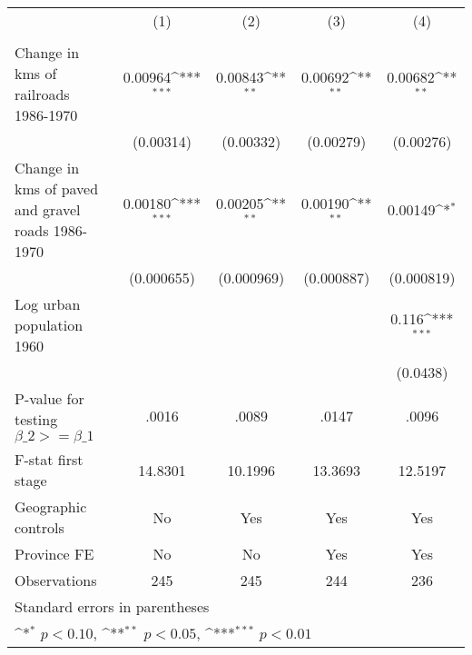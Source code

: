{
\def\sym#1{\ifmmode^{#1}\else\(^{#1}\)\fi}
\begin{tabular}{l*{4}{c}}
\hline\hline
                &\multicolumn{1}{c}{(1)}&\multicolumn{1}{c}{(2)}&\multicolumn{1}{c}{(3)}&\multicolumn{1}{c}{(4)}\\
                &\multicolumn{1}{c}{}&\multicolumn{1}{c}{}&\multicolumn{1}{c}{}&\multicolumn{1}{c}{}\\
\hline
Change in kms of railroads 1986-1970&  0.00964\sym{***}&  0.00843\sym{**} &  0.00692\sym{**} &  0.00682\sym{**} \\
                &(0.00314)         &(0.00332)         &(0.00279)         &(0.00276)         \\
[1em]
Change in kms of paved and gravel roads 1986-1970&  0.00180\sym{***}&  0.00205\sym{**} &  0.00190\sym{**} &  0.00149\sym{*}  \\
                &(0.000655)         &(0.000969)         &(0.000887)         &(0.000819)         \\
[1em]
Log urban population 1960&                  &                  &                  &    0.116\sym{***}\\
                &                  &                  &                  & (0.0438)         \\
\hline
P-value for testing $\beta\_{2} >= \beta\_{1}$&    .0016         &    .0089         &    .0147         &    .0096         \\
F-stat first stage&  14.8301         &  10.1996         &  13.3693         &  12.5197         \\
Geographic controls&       No         &      Yes         &      Yes         &      Yes         \\
Province FE     &       No         &       No         &      Yes         &      Yes         \\
Observations    &      245         &      245         &      244         &      236         \\
\hline\hline
\multicolumn{5}{l}{\footnotesize Standard errors in parentheses}\\
\multicolumn{5}{l}{\footnotesize \sym{*} \(p<0.10\), \sym{**} \(p<0.05\), \sym{***} \(p<0.01\)}\\
\end{tabular}
}

